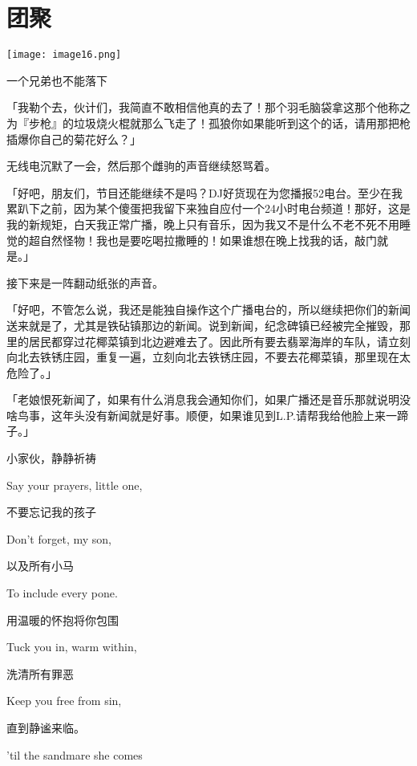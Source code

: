 \chapter{团聚}

\texttt{[image: image16.png]}

\begin{intro}
    一个兄弟也不能落下
\end{intro}

「{\rt 我勒个去，伙计们，我简直不敢相信他真的去了！那个羽毛脑袋拿这那个他称之为『步枪』的垃圾烧火棍就那么飞走了！孤狼你如果能听到这个的话，请用那把枪插爆你自己的菊花好么？}」

无线电沉默了一会，然后那个雌驹的声音继续怒骂着。

「{\rt 好吧，朋友们，节目还能继续不是吗？DJ好货现在为您播报52电台。至少在我累趴下之前，因为某个傻蛋把我留下来独自应付一个24小时电台频道！那好，这是我的新规矩，白天我正常广播，晚上只有音乐，因为我又不是什么不老不死不用睡觉的超自然怪物！我也是要吃喝拉撒睡的！如果谁想在晚上找我的话，敲门就是。}」

接下来是一阵翻动纸张的声音。

「{\rt 好吧，不管怎么说，我还是能独自操作这个广播电台的，所以继续把你们的新闻送来就是了，尤其是铁砧镇那边的新闻。说到新闻，纪念碑镇已经被完全摧毁，那里的居民都穿过花椰菜镇到北边避难去了。因此所有要去翡翠海岸的车队，请立刻向北去铁锈庄园，重复一遍，立刻向北去铁锈庄园，不要去花椰菜镇，那里现在太危险了。}」

「{\rt 老娘恨死新闻了，如果有什么消息我会通知你们，如果广播还是音乐那就说明没啥鸟事，这年头没有新闻就是好事。顺便，如果谁见到L.P.请帮我给他脸上来一蹄子。}」


\begin{song}
    小家伙，静静祈祷
    
    Say your prayers, little one,
    
    \medskip

    不要忘记我的孩子
    
    Don't forget, my son,
    
    \medskip

    以及所有小马
    
    To include every pone.
    
    \medskip

    用温暖的怀抱将你包围
    
    Tuck you in, warm within,
    
    \medskip

    洗清所有罪恶
    
    Keep you free from sin,
    
    \medskip

    直到静谧来临。
    
    'til the sandmare she comes
\end{song}

